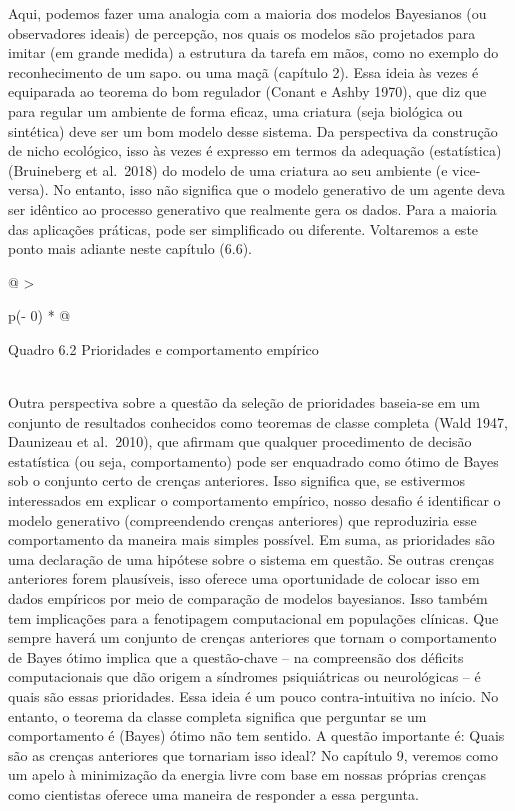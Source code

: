 \documentclass[
  12pt,
]{book}
\begin{document}
Aqui, podemos fazer uma analogia com a maioria dos modelos Bayesianos (ou observadores ideais) de percepção, nos quais os modelos são projetados para imitar (em grande medida) a estrutura da tarefa em mãos, como no exemplo do reconhecimento de um sapo. ou uma maçã (capítulo 2). Essa ideia às vezes é equiparada ao teorema do bom regulador (Conant e Ashby 1970), que diz que para regular um ambiente de forma eficaz, uma criatura (seja biológica ou sintética) deve ser um bom modelo desse sistema. Da perspectiva da construção de nicho ecológico, isso às vezes é expresso em termos da adequação (estatística) (Bruineberg et al.~2018) do modelo de uma criatura ao seu ambiente (e vice-versa). No entanto, isso não significa que o modelo generativo de um agente deva ser idêntico ao processo generativo que realmente gera os dados. Para a maioria das aplicações práticas, pode ser simplificado ou diferente. Voltaremos a este ponto mais adiante neste capítulo (6.6).

\begin{longtable}[]{@{}
  >{\raggedright\arraybackslash}p{(\columnwidth - 0\tabcolsep) * }@{}}
\toprule
\begin{minipage}[b]{\linewidth}\raggedright
Quadro 6.2 Prioridades e comportamento empírico
\end{minipage} \\
\midrule
\endhead
Outra perspectiva sobre a questão da seleção de prioridades baseia-se em um conjunto de resultados conhecidos como teoremas de classe completa (Wald 1947, Daunizeau et al.~2010), que afirmam que qualquer procedimento de decisão estatística (ou seja, comportamento) pode ser enquadrado como ótimo de Bayes sob o conjunto certo de crenças anteriores. Isso significa que, se estivermos interessados \hspace{0pt}\hspace{0pt}em explicar o comportamento empírico, nosso desafio é identificar o modelo generativo (compreendendo crenças anteriores) que reproduziria esse comportamento da maneira mais simples possível. Em suma, as prioridades são uma declaração de uma hipótese sobre o sistema em questão. Se outras crenças anteriores forem plausíveis, isso oferece uma oportunidade de colocar isso em dados empíricos por meio de comparação de modelos bayesianos. Isso também tem implicações para a fenotipagem computacional em populações clínicas. Que sempre haverá um conjunto de crenças anteriores que tornam o comportamento de Bayes ótimo implica que a questão-chave -- na compreensão dos déficits computacionais que dão origem a síndromes psiquiátricas ou neurológicas -- é quais são essas prioridades. Essa ideia é um pouco contra-intuitiva no início. No entanto, o teorema da classe completa significa que perguntar se um comportamento é (Bayes) ótimo não tem sentido. A questão importante é: Quais são as crenças anteriores que tornariam isso ideal? No capítulo 9, veremos como um apelo à minimização da energia livre com base em nossas próprias crenças como cientistas oferece uma maneira de responder a essa pergunta. \\
\bottomrule
\end{longtable}
\end{document}
